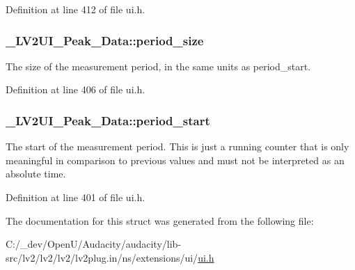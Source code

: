 Definition at line 412 of file ui.\+h.

\subsubsection[{\texorpdfstring{period\+\_\+size}{period_size}}]{ \+\_\+\+L\+V2\+U\+I\+\_\+\+Peak\+\_\+\+Data\+::period\+\_\+size}\hypertarget{struct___l_v2_u_i___peak___data_abff5d80cd31d23bf30d3773d0066a5bb}{}\label{struct___l_v2_u_i___peak___data_abff5d80cd31d23bf30d3773d0066a5bb}
The size of the measurement period, in the same units as period\+\_\+start. 

Definition at line 406 of file ui.\+h.

\subsubsection[{\texorpdfstring{period\+\_\+start}{period_start}}]{ \+\_\+\+L\+V2\+U\+I\+\_\+\+Peak\+\_\+\+Data\+::period\+\_\+start}\hypertarget{struct___l_v2_u_i___peak___data_ae2b4f0e5b09a0ae11ffe24a120881839}{}\label{struct___l_v2_u_i___peak___data_ae2b4f0e5b09a0ae11ffe24a120881839}
The start of the measurement period. This is just a running counter that is only meaningful in comparison to previous values and must not be interpreted as an absolute time. 

Definition at line 401 of file ui.\+h.



The documentation for this struct was generated from the following file\+:\begin{DoxyCompactItemize}
\item 
C\+:/\+\_\+dev/\+Open\+U/\+Audacity/audacity/lib-\/src/lv2/lv2/lv2/lv2plug.\+in/ns/extensions/ui/\hyperlink{ui_8h}{ui.\+h}\end{DoxyCompactItemize}
